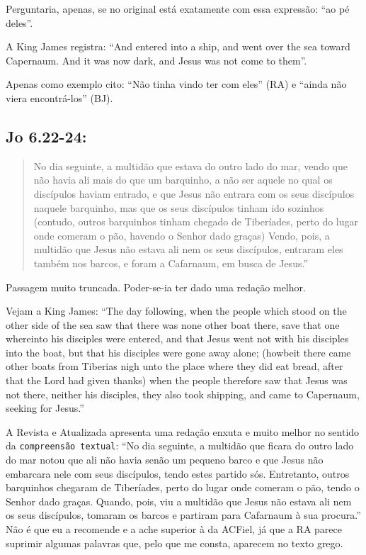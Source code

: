 Perguntaria, apenas, se no original está exatamente com essa expressão: ``ao pé deles''.

A King James registra: ``And entered into a ship, and went over the sea toward Capernaum. And it was now dark, and Jesus was not come to them''.

Apenas como exemplo cito: ``Não tinha vindo ter com eles'' (RA) e ``ainda não viera encontrá-los'' (BJ).

\subsection*{Jo 6.22-24:}
\begin{quote}
    \small
No dia seguinte, a multidão que estava do outro lado do mar, vendo que não havia ali mais do que um barquinho, a não ser aquele no qual os discípulos haviam entrado, e que Jesus não entrara com os seus discípulos naquele barquinho, mas que os seus discípulos tinham ido sozinhos (contudo, outros barquinhos tinham chegado de Tiberíades, perto do lugar onde comeram o pão, havendo o Senhor dado graças) Vendo, pois, a multidão que Jesus não estava ali nem os seus discípulos, entraram eles também nos barcos, e foram a Cafarnaum, em busca de Jesus.''
\end{quote}

Passagem muito truncada. Poder-se-ia ter dado uma redação melhor.

Vejam a King James: ``The day following, when the people which stood on the other side of the sea saw that there was none other boat there, save that one whereinto his disciples were entered, and that Jesus went not with his disciples into the boat, but that his disciples were gone away alone; (howbeit there came other boats from Tiberias nigh unto the place where they did eat bread, after that the Lord had given thanks) when the people therefore saw that Jesus was not there, neither his disciples, they also took shipping, and came to Capernaum, seeking for Jesus.''

A Revista e Atualizada apresenta uma redação enxuta e muito melhor no
sentido da \texttt{compreensão textual}: ``No dia seguinte, a multidão que
ficara do outro lado do mar notou que ali não havia senão um pequeno
barco e que Jesus não embarcara nele com seus discípulos, tendo estes
partido sós. Entretanto, outros barquinhos chegaram de Tiberíades,
perto do lugar onde comeram o pão, tendo o Senhor dado graças. Quando,
pois, viu a multidão que Jesus não estava ali nem os seus discípulos,
tomaram os barcos e partiram para Cafarnaum à sua procura.'' Não é que
eu a recomende e a ache superior à da ACFiel, já que a RA parece
suprimir algumas palavras que, pelo que me consta, aparecem no texto
grego.


